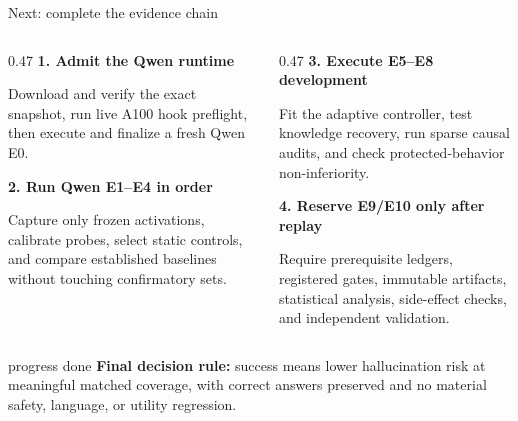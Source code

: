 \documentclass[aspectratio=169,11pt]{beamer}
\begin{document}
\begin{frame}{Next: complete the evidence chain}
  \footnotesize
  \begin{columns}[T,onlytextwidth]
    \begin{column}{0.47\textwidth}
      \textbf{1. Admit the Qwen runtime}\par
      Download and verify the exact snapshot, run live A100 hook preflight, then execute and finalize a fresh Qwen E0.\par\vspace{0.25cm}
      \textbf{2. Run Qwen E1--E4 in order}\par
      Capture only frozen activations, calibrate probes, select static controls, and compare established baselines without touching confirmatory sets.
    \end{column}
    \begin{column}{0.47\textwidth}
      \textbf{3. Execute E5--E8 development}\par
      Fit the adaptive controller, test knowledge recovery, run sparse causal audits, and check protected-behavior non-inferiority.\par\vspace{0.25cm}
      \textbf{4. Reserve E9/E10 only after replay}\par
      Require prerequisite ledgers, registered gates, immutable artifacts, statistical analysis, side-effect checks, and independent validation.
    \end{column}
  \end{columns}
  \vspace{0.2cm}
  \begin{beamercolorbox}[rounded=true,sep=0.3em]{progress done}
    \textbf{Final decision rule:} success means lower hallucination risk at meaningful matched coverage, with correct answers preserved and no material safety, language, or utility regression.
  \end{beamercolorbox}
\end{frame}
\end{document}
